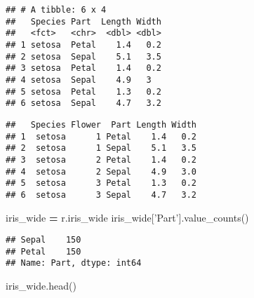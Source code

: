 \documentclass[]{article}
\newenvironment{Shaded}{\begin{snugshade}}{\end{snugshade}}
\newcommand{\CharTok}[1]{\textcolor[rgb]{0.31,0.60,0.02}{#1}}
\newcommand{\DecValTok}[1]{\textcolor[rgb]{0.00,0.00,0.81}{#1}}
\newcommand{\KeywordTok}[1]{\textcolor[rgb]{0.13,0.29,0.53}{\textbf{#1}}}
\newcommand{\NormalTok}[1]{#1}
\newcommand{\OperatorTok}[1]{\textcolor[rgb]{0.81,0.36,0.00}{\textbf{#1}}}
\newcommand{\StringTok}[1]{\textcolor[rgb]{0.31,0.60,0.02}{#1}}
\begin{document}
\begin{verbatim}
## # A tibble: 6 x 4
##   Species Part  Length Width
##   <fct>   <chr>  <dbl> <dbl>
## 1 setosa  Petal    1.4   0.2
## 2 setosa  Sepal    5.1   3.5
## 3 setosa  Petal    1.4   0.2
## 4 setosa  Sepal    4.9   3  
## 5 setosa  Petal    1.3   0.2
## 6 setosa  Sepal    4.7   3.2
\end{verbatim}

\begin{Shaded}
\end{Shaded}

\begin{verbatim}
##   Species Flower  Part Length Width
## 1  setosa      1 Petal    1.4   0.2
## 2  setosa      1 Sepal    5.1   3.5
## 3  setosa      2 Petal    1.4   0.2
## 4  setosa      2 Sepal    4.9   3.0
## 5  setosa      3 Petal    1.3   0.2
## 6  setosa      3 Sepal    4.7   3.2
\end{verbatim}

\begin{Shaded}
\begin{Highlighting}[]
\NormalTok{iris_wide }\OperatorTok{=}\NormalTok{ r.iris_wide}
\NormalTok{iris_wide[}\StringTok{'Part'}\NormalTok{].value_counts()}
\end{Highlighting}
\end{Shaded}

\begin{verbatim}
## Sepal    150
## Petal    150
## Name: Part, dtype: int64
\end{verbatim}

\begin{Shaded}
\begin{Highlighting}[]
\NormalTok{iris_wide.head()}
\end{Highlighting}
\end{Shaded}
\end{document}
